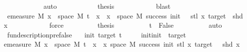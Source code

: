 \begin{isabellebody}
\ \ \ \ \ \ \ \ \ \ \isamarkupfalse%
\ auto\isanewline
\ \ \ \ \ \ \ \ \isamarkupfalse%
\ \isamarkupfalse%
\ {\isacharquery}{\kern0pt}thesis\isanewline
\ \ \ \ \ \ \ \ \ \ \isamarkupfalse%
\ blast\isanewline
\ \ \ \ \ \ \isamarkupfalse%
\isanewline
\ \ \ \ \ \ \isamarkupfalse%
\ \isamarkupfalse%
\ {\isachardoublequoteopen}emeasure\ M\ {\isacharbraceleft}{\kern0pt}x\ {\isasymin}\ space\ M{\isachardot}{\kern0pt}\ t\ {\isacharhash}{\kern0pt}{\isacharhash}{\kern0pt}\ x\ {\isasymin}\ {\isacharbraceleft}{\kern0pt}x\ {\isasymin}\ space\ M{\isachardot}{\kern0pt}\ success\ {\isacharparenleft}{\kern0pt}init\ {\isacharplus}{\kern0pt}\ {}{\isacharparenright}{\kern0pt}\ {\isacharparenleft}{\kern0pt}stl\ x{\isacharparenright}{\kern0pt}\ target\ {\isasymand}\ shd\ x{\isacharbraceright}{\kern0pt}{\isacharbraceright}{\kern0pt}\ {\isacharequal}{\kern0pt}\ {}{\isachardoublequoteclose}\isanewline
\ \ \ \ \ \ \ \ \isamarkupfalse%
\ force\isanewline
\ \ \ \ \ \ \isamarkupfalse%
\ \isamarkupfalse%
\ {\isacharquery}{\kern0pt}thesis\isanewline
\ \ \ \ \ \ \ \ \isamarkupfalse%
\ {\isacartoucheopen}t\ {\isacharequal}{\kern0pt}\ False{\isacartoucheclose}\isanewline
\ \ \ \ \ \ \ \ \isamarkupfalse%
\ auto\isanewline
\ \ \ \ \isamarkupfalse%
%
\endisatagproof
{\isafoldproof}%
%
\isadelimproof
\isanewline
%
\endisadelimproof
\isanewline
{}\isamarkupfalse%
\ fun{\isacharunderscore}{\kern0pt}description{\isacharunderscore}{\kern0pt}pre{\isacharunderscore}{\kern0pt}false{\isacharcolon}{\kern0pt}\isanewline
\ \ \ init\ target\ t\isanewline
\ \ \ {\isachardoublequoteopen}{}\ {\isacharless}{\kern0pt}\ init{\isachardoublequoteclose}{\isachardoublequoteopen}init\ {\isacharless}{\kern0pt}\ target{\isachardoublequoteclose}\isanewline
\ \ \isanewline
{\isachardoublequoteopen}emeasure\ M\ {\isacharbraceleft}{\kern0pt}x\ {\isasymin}\ space\ M{\isachardot}{\kern0pt}\ t\ {\isacharhash}{\kern0pt}{\isacharhash}{\kern0pt}\ x\ {\isasymin}\ {\isacharbraceleft}{\kern0pt}x{\isasymin}\ space\ M{\isachardot}{\kern0pt}\ success\ {\isacharparenleft}{\kern0pt}init{\isacharminus}{\kern0pt}{}{\isacharparenright}{\kern0pt}\ {\isacharparenleft}{\kern0pt}stl\ x{\isacharparenright}{\kern0pt}\ target\ {\isasymand}\ {\isasymnot}\ shd\ x{\isacharbraceright}{\kern0pt}{\isacharbraceright}{\kern0pt}\ \isanewline

\end{isabellebody}
